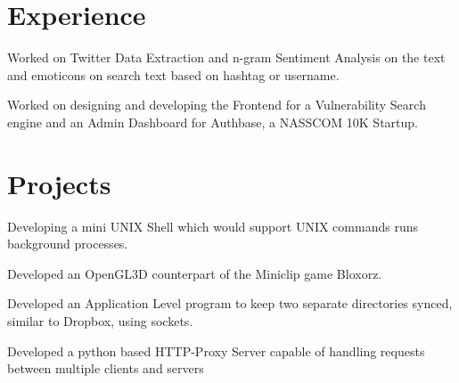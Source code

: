 \documentclass[]{deedy-resume-openfont}
\begin{document}
\begin{minipage}[t]{0.66\textwidth} 

\vspace{1cm}
\section{Experience}

\vspace{\topsep} %
\begin{tightemize}\item Worked on Twitter Data Extraction and n-gram Sentiment Analysis on the text and emoticons on search text based on hashtag or username.
\end{tightemize}
\sectionsep

\begin{tightemize}
\item Worked on designing and developing the Frontend for a Vulnerability Search engine and an Admin Dashboard for Authbase, a NASSCOM 10K Startup.\end{tightemize}
\sectionsep




\section{Projects}

Developing a mini UNIX Shell which would support UNIX commands runs background processes.
\sectionsep

Developed an OpenGL3D counterpart of the Miniclip game Bloxorz.
\sectionsep

Developed an Application Level program to keep two separate directories synced, similar to Dropbox, using sockets.
\sectionsep

Developed a python based HTTP-Proxy Server capable of handling requests between multiple clients and servers
\sectionsep


\end{minipage}
\end{document}
